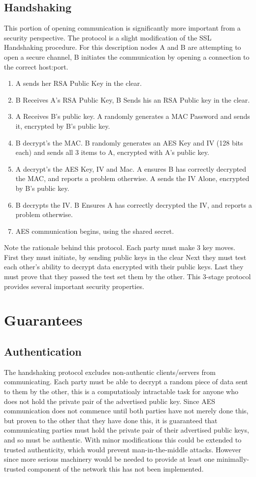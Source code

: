 \subsection{Handshaking}
This portion of opening communication is significantly more important from a security perspective.
The protocol is a slight modification of the SSL Handshaking procedure.
For this description nodes A and B are attempting to open a secure channel, B initiates the communication by opening a connection to the correct host:port.
\begin{enumerate}
	\item A sends her RSA Public Key in the clear.
	\item B Receives A's RSA Public Key, B Sends his an RSA Public key in the clear.
	\item A Receives B's public key. A randomly generates a MAC Password and sends it, encrypted by B's public key.
	\item B decrypt's the MAC.  B randomly generates an AES Key and IV (128 bits each) and sends all 3 items to A, encrypted with A's public key.
	\item A decrypt's the AES Key, IV and Mac.  A ensures B has correctly decrypted the MAC, and reports a problem otherwise.  A sends the IV Alone, encrypted by B's public key.
	\item B decrypts the IV.  B Ensures A has correctly decrypted the IV, and reports a problem otherwise.
	\item AES communication begins, using the shared secret.
\end{enumerate}
Note the rationale behind this protocol.
Each party must make 3 key moves.
First they must initiate, by sending public keys in the clear
Next they must test each other's ability to decrypt data encrypted with their public keys.
Last they must prove that they passed the test set them by the other.
This 3-stage protocol provides several important security properties.

\section {Guarantees}
\subsection{Authentication}
The handshaking protocol excludes non-authentic clients/servers from communicating.
Each party must be able to decrypt a random piece of data sent to them by the other, this is a computatioaly intractable task for anyone who does not hold the private pair of the advertised public key.
Since AES communication does not commence until both parties have not merely done this, but proven to the other that they have done this, it is guaranteed that communicating parties must hold the private pair of their advertised public keys, and so must be authentic.
With minor modifications this could be extended to trusted authenticity, which would prevent man-in-the-middle attacks.
However since more serious machinery would be needed to provide at least one minimally-trusted component of the network this has not been implemented.
